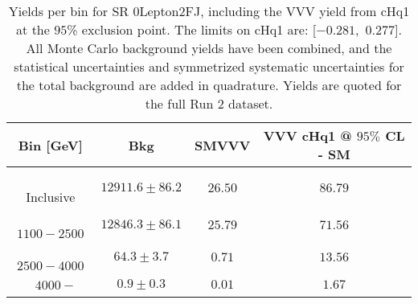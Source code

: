 \begin{table}[!htbp]
    \small
    \center
    \begin{tabular}{c||c|c|c}
    Bin [GeV] & Bkg & SMVVV & \pbox{20cm}{VVV \\ cHq1 @ $95\%$ CL - SM \\ }\\
    \hline
    \pbox{20cm}{ ~ \\Inclusive\\ } & $12911.6 \pm 86.2$ & $26.50$ & $86.79$\\
    \hline
    \pbox{20cm}{ ~ \\$1100-2500$\\ } & $12846.3 \pm 86.1$ & $25.79$ & $71.56$\\
    \hline
    \pbox{20cm}{ ~ \\$2500-4000$\\ } & $64.3 \pm 3.7$ & $0.71$ & $13.56$\\
    \hline
    \pbox{20cm}{ ~ \\$4000-$\\ } & $0.9 \pm 0.3$ & $0.01$ & $1.67$\\
\end{tabular}
    \caption{Yields per bin for SR 0Lepton2FJ, including the VVV yield from cHq1 at the $95$\% exclusion point. The limits on cHq1 are: [$-0.281$,~$0.277$]. All Monte Carlo background yields have been combined, and the statistical uncertainties and symmetrized systematic uncertainties for the total background are added in quadrature. Yields are quoted for the full Run 2 dataset.}
    \label{tab:0Lepton2FJ$binssignal}
\end{table}
